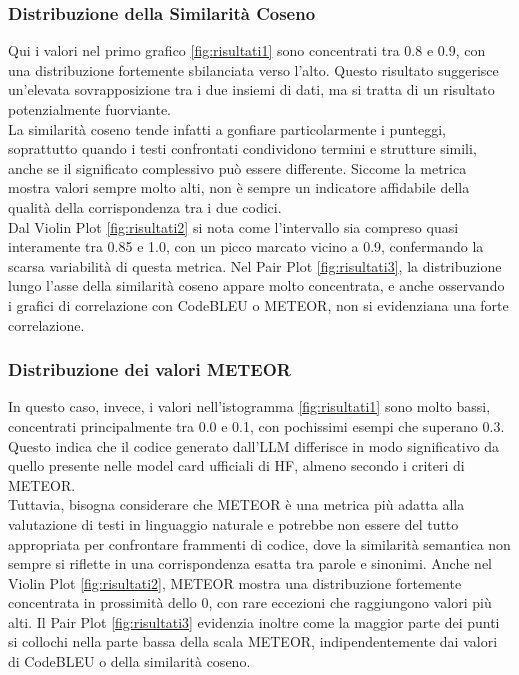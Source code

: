 \documentclass{article}
\begin{document}
\subsubsection{Distribuzione della Similarità Coseno}
Qui i valori nel primo grafico \ref{fig:risultati1} sono concentrati tra 0.8 e 0.9, con una distribuzione fortemente sbilanciata verso l’alto. Questo risultato suggerisce un’elevata sovrapposizione tra i due insiemi di dati, ma si tratta di un risultato potenzialmente fuorviante.\\
La similarità coseno tende infatti a gonfiare particolarmente i punteggi, soprattutto quando i testi confrontati condividono termini e strutture simili, anche se il significato complessivo può essere differente. Siccome la metrica mostra valori sempre molto alti, non è sempre un indicatore affidabile della qualità della corrispondenza tra i due codici.\\
Dal Violin Plot \ref{fig:risultati2} si nota come l’intervallo sia compreso quasi interamente tra 0.85 e 1.0, con un picco marcato vicino a 0.9, confermando la scarsa variabilità di questa metrica. Nel Pair Plot \ref{fig:risultati3}, la distribuzione lungo l’asse della similarità coseno appare molto concentrata, e anche osservando i grafici di correlazione con CodeBLEU o METEOR, non si evidenziana una forte correlazione.

\subsubsection{Distribuzione dei valori METEOR}
In questo caso, invece, i valori nell'istogramma \ref{fig:risultati1} sono molto bassi, concentrati principalmente tra 0.0 e 0.1, con pochissimi esempi che superano 0.3. Questo indica che il codice generato dall’LLM differisce in modo significativo da quello presente nelle model card ufficiali di HF, almeno secondo i criteri di METEOR.\\
Tuttavia, bisogna considerare che METEOR è una metrica più adatta alla valutazione di testi in linguaggio naturale e potrebbe non essere del tutto appropriata per confrontare frammenti di codice, dove la similarità semantica non sempre si riflette in una corrispondenza esatta tra parole e sinonimi. Anche nel Violin Plot \ref{fig:risultati2}, METEOR mostra una distribuzione fortemente concentrata in prossimità dello 0, con rare eccezioni che raggiungono valori più alti. Il Pair Plot \ref{fig:risultati3} evidenzia inoltre come la maggior parte dei punti si collochi nella parte bassa della scala METEOR, indipendentemente dai valori di CodeBLEU o della similarità coseno.
\end{document}
